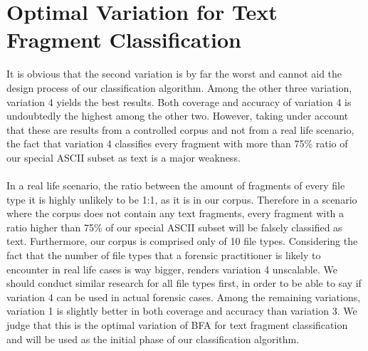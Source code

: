 \section{Optimal Variation for Text Fragment Classification}
It is obvious that the second variation is by far the worst and cannot aid the design process of our classification algorithm. Among the other three variation, variation 4 yields the best results. Both coverage and accuracy of variation 4 is undoubtedly the highest among the other two. However, taking under account that these are results from a controlled corpus and not from a real life scenario, the fact that variation 4 classifies every fragment with more than 75\% ratio of our special ASCII subset as text is a major weakness.\\\\
 In a real life scenario, the ratio between the amount of fragments of every file type it is highly unlikely to be 1:1, as it is in our corpus. Therefore in a scenario where the corpus does not contain any text fragments, every fragment with a ratio higher than 75\% of our special ASCII subset will be falsely classified as text. Furthermore, our corpus is comprised only of 10 file types. Considering the fact that the number of file types that a forensic practitioner is likely to encounter in real life cases is way bigger, renders variation 4 unscalable. We should conduct similar research for all file types first, in order to be able to say if variation 4 can be used in actual forensic cases. Among the remaining variations, variation 1 is slightly better in both coverage and accuracy than variation 3. We judge that this is the optimal variation of BFA for text fragment classification and will be used as the initial phase of our classification algorithm.


